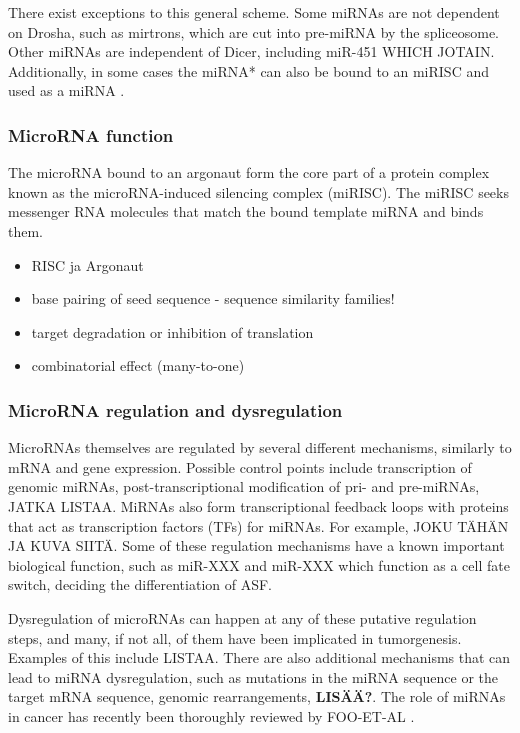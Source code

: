 There exist exceptions to this general scheme. Some miRNAs are not
dependent on Drosha, such as mirtrons, which are cut into pre-miRNA by
the spliceosome. Other miRNAs are independent of Dicer, including
miR-451 WHICH JOTAIN. Additionally, in some cases the miRNA* can also be
bound to an miRISC and used as a miRNA \cite{CITE}.


\subsubsection{MicroRNA function}\label{microrna-function}

The microRNA bound to an argonaut form the core part of a protein
complex known as the microRNA-induced silencing complex (miRISC). The
miRISC seeks messenger RNA molecules that match the bound template miRNA
and binds them.

\begin{itemize}
\tightlist
\item
  RISC ja Argonaut
\item
  base pairing of seed sequence - sequence similarity families!
\item
  target degradation or inhibition of translation
\item
  combinatorial effect (many-to-one)
\end{itemize}


\subsubsection{MicroRNA regulation and
dysregulation}\label{microrna-regulation-and-dysregulation}

MicroRNAs themselves are regulated by several different mechanisms,
similarly to mRNA and gene expression. Possible control points include
transcription of genomic miRNAs, post-transcriptional modification of
pri- and pre-miRNAs, JATKA LISTAA. MiRNAs also form transcriptional
feedback loops with proteins that act as transcription factors (TFs) for
miRNAs. For example, JOKU TÄHÄN JA KUVA SIITÄ. Some of these regulation
mechanisms have a known important biological function, such as miR-XXX
and miR-XXX which function as a cell fate switch, deciding the
differentiation of ASF.

Dysregulation of microRNAs can happen at any of these putative
regulation steps, and many, if not all, of them have been implicated in
tumorgenesis. Examples of this include LISTAA. There are also additional
mechanisms that can lead to miRNA dysregulation, such as mutations in
the miRNA sequence or the target mRNA sequence, genomic rearrangements,
\textbf{LISÄÄ?}. The role of miRNAs in cancer has recently been
thoroughly reviewed by FOO-ET-AL \cite{CITE}.

